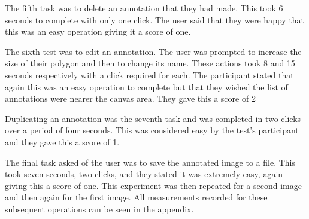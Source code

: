 The fifth task was to delete an annotation that they had made.  This took 6 seconds to complete with only one click.  The user said that they were happy that this was an easy operation giving it a score of one.

The sixth test was to edit an annotation.  The user was prompted to increase the size of their polygon and then to change its name.  These actions took 8 and 15 seconds respectively with a click required for each.  The participant stated that again this was an easy operation to complete but that they wished the list of annotations were nearer the canvas area.  They gave this a score of 2

Duplicating an annotation was the seventh task and was completed in two clicks over a period of four seconds.  This was considered easy by the test's participant and they gave this a score of 1.

The final task asked of the user was to save the annotated image to a file.  This took seven seconds, two clicks, and they stated it was extremely easy, again giving this a score of one.  This experiment was then repeated for a second image and then again for the first image.  All measurements recorded for these subsequent operations can be seen in the appendix.
